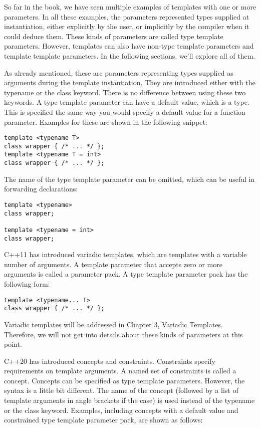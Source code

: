 
So far in the book, we have seen multiple examples of templates with one or more parameters. In all these examples, the parameters represented types supplied at instantiation, either explicitly by the user, or implicitly by the compiler when it could deduce them. These kinds of parameters are called type template parameters. However, templates can also have non-type template parameters and template template parameters. In the following sections, we'll explore all of them.


As already mentioned, these are parameters representing types supplied as arguments during the template instantiation. They are introduced either with the typename or the class keyword. There is no difference between using these two keywords. A type template parameter can have a default value, which is a type. This is specified the same way you would specify a default value for a function parameter. Examples for these are shown in the following snippet:

\begin{lstlisting}[style=styleCXX]
template <typename T>
class wrapper { /* ... */ };
template <typename T = int>
class wrapper { /* ... */ };
\end{lstlisting}

The name of the type template parameter can be omitted, which can be useful in forwarding declarations:

\begin{lstlisting}[style=styleCXX]
template <typename>
class wrapper;

template <typename = int>
class wrapper;
\end{lstlisting}

C++11 has introduced variadic templates, which are templates with a variable number of arguments. A template parameter that accepts zero or more arguments is called a parameter pack. A type template parameter pack has the following form:

\begin{lstlisting}[style=styleCXX]
template <typename... T>
class wrapper { /* ... */ };
\end{lstlisting}

Variadic templates will be addressed in Chapter 3, Variadic Templates. Therefore, we will not get into details about these kinds of parameters at this point.

C++20 has introduced concepts and constraints. Constraints specify requirements on template arguments. A named set of constraints is called a concept. Concepts can be specified as type template parameters. However, the syntax is a little bit different. The name of the concept (followed by a list of template arguments in angle brackets if the case) is used instead of the typename or the class keyword. Examples, including concepts with a default value and constrained type template parameter pack, are shown as follows:

